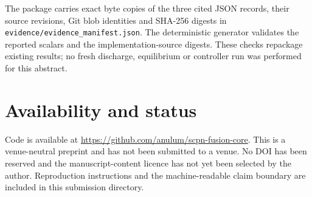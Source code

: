 \documentclass[11pt]{article}
\begin{document}
The package carries exact byte copies of the three cited JSON records, their
source revisions, Git blob identities and SHA-256 digests in
\texttt{evidence/evidence\_manifest.json}.  The deterministic generator validates
the reported scalars and the implementation-source digests.  These checks
repackage existing results; no fresh discharge, equilibrium or controller run
was performed for this abstract.

\section*{Availability and status}

Code is available at \url{https://github.com/anulum/scpn-fusion-core}.  This is
a venue-neutral preprint and has not been submitted to a venue.  No DOI has
been reserved and the manuscript-content licence has not yet been selected by
the author.  Reproduction instructions and the machine-readable claim boundary
are included in this submission directory.


\end{document}
